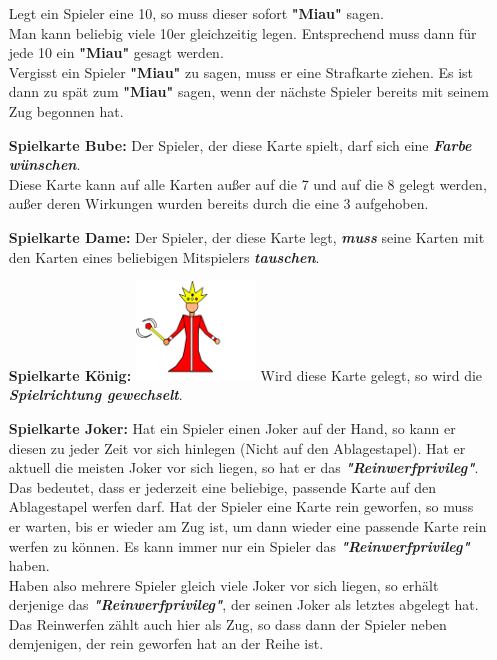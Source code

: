 \documentclass{article}
\begin{document}
\begin{itemize}
Legt ein Spieler eine 10, so muss dieser sofort \textbf{"Miau"} sagen. \\
Man kann beliebig viele 10er gleichzeitig legen. Entsprechend muss dann für jede 10 ein \textbf{"Miau"} gesagt werden. \\ Vergisst ein Spieler \textbf{"Miau"} zu sagen, muss er eine Strafkarte ziehen. Es ist dann zu spät zum \textbf{"Miau"} sagen, wenn der nächste Spieler bereits mit seinem Zug begonnen hat.
\item[\textbf{Spielkarte Bube:}]
Der Spieler, der diese Karte spielt, darf sich eine \textit{\textbf{Farbe wünschen}}. \\ Diese Karte kann auf alle Karten außer auf die 7 und auf die 8 gelegt werden, außer deren Wirkungen wurden bereits durch die eine 3 aufgehoben.
\item[\textbf{Spielkarte Dame:}]
Der Spieler, der diese Karte legt, \textit{\textbf{muss}} seine Karten mit den Karten eines beliebigen Mitspielers \textit{\textbf{tauschen}}.
\item[\textbf{Spielkarte König:}]
\includegraphics[width=0.25\textwidth]{photos/king.png}
Wird diese Karte gelegt, so wird die \textit{\textbf{Spielrichtung gewechselt}}.
\item[\textbf{Spielkarte Joker:}]
Hat ein Spieler einen Joker auf der Hand, so kann er diesen zu jeder Zeit vor sich hinlegen (Nicht auf den Ablagestapel). Hat er aktuell die meisten Joker vor sich liegen, so hat er das \textit{\textbf{"Reinwerfprivileg"}}. \\
Das bedeutet, dass er jederzeit eine beliebige, passende Karte auf den Ablagestapel werfen darf. Hat der Spieler eine Karte rein geworfen, so muss er warten, bis er wieder am Zug ist, um dann wieder eine passende Karte rein werfen zu können. Es kann immer nur ein Spieler das \textit{\textbf{"Reinwerfprivileg"}} haben. \\
Haben also mehrere Spieler gleich viele Joker vor sich liegen, so erhält derjenige das \textit{\textbf{"Reinwerfprivileg"}}, der seinen Joker als letztes abgelegt hat.  \\
Das Reinwerfen zählt auch hier als Zug, so dass dann der Spieler neben demjenigen, der rein geworfen hat an der Reihe ist. \\

\end{itemize}
\end{document}

